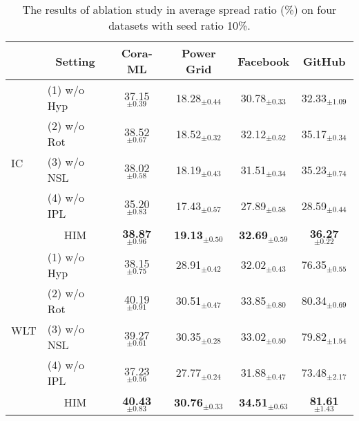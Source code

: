 \begin{table}[!tb]
\caption{The results of ablation study in average spread ratio (\%) on four datasets with seed ratio 10\%.}
\resizebox{\columnwidth}{!} {
\begin{tabular}{l|lcccc}
\toprule
\multicolumn{1}{c}{~} & \multicolumn{1}{c}{Setting}         
  & Cora-ML                                    
  & Power Grid           
  & Facebook           
  & GitHub     
\\ 
\midrule
\multirow{5}{*}{IC}   
& (1) w/o Hyp & 37.15$_{\pm0.39}$         
& 18.28$_{\pm0.44}$              
& 30.78$_{\pm0.33}$                 
& 32.33$_{\pm1.09}$              
\\
       
& (2) w/o Rot & 38.52$_{\pm0.67}$       
& 18.52$_{\pm0.32}$                  
& 32.12$_{\pm0.52}$                
& 35.17$_{\pm0.34}$              
\\
        
& (3) w/o NSL & 38.02$_{\pm0.58}$       
& 18.19$_{\pm0.43}$                
& 31.51$_{\pm0.34}$               
& 35.23$_{\pm0.74}$             
\\
       
& (4) w/o IPL & 35.20$_{\pm0.83}$         
& 17.43$_{\pm0.57}$                     
& 27.89$_{\pm0.58}$                   
& 28.59$_{\pm0.44}$                    
\\ \cline{2-6} 
           
& \multicolumn{1}{c}{HIM}      
& \textbf{38.87}$_{\pm0.96}$ 
& \textbf{19.13}$_{\pm0.50}$ 
& \textbf{32.69}$_{\pm0.59}$ 
& \textbf{36.27}$_{\pm0.22}$ 
\\ 
\midrule
\multirow{5}{*}{WLT}                    
& (1) w/o Hyp & 38.15$_{\pm0.75}$           
& 28.91$_{\pm0.42}$                       
& 32.02$_{\pm0.43}$                     
& 76.35$_{\pm0.55}$                
\\
& (2) w/o Rot & 40.19$_{\pm0.91}$        
& 30.51$_{\pm0.47}$                      
& 33.85$_{\pm0.80}$                      
& 80.34$_{\pm0.69}$                   
\\
& (3) w/o NSL & 39.27$_{\pm0.61}$  
& 30.35$_{\pm0.28}$                 
& 33.02$_{\pm0.50}$                    
& 79.82$_{\pm1.54}$                    
\\
& (4) w/o IPL & 37.23$_{\pm0.56}$   
& 27.77$_{\pm0.24}$                  
& 31.88$_{\pm0.47}$                 
& 73.48$_{\pm2.17}$               
\\ \cline{2-6} 
& \multicolumn{1}{c}{HIM}      
& \textbf{40.43}$_{\pm0.83}$
& \textbf{30.76}$_{\pm0.33}$ 
& \textbf{34.51}$_{\pm0.63}$ 
& \textbf{81.61}$_{\pm1.43}$ 
\\ 
\bottomrule
\end{tabular} }
\label{table:ablation} 
\end{table}
